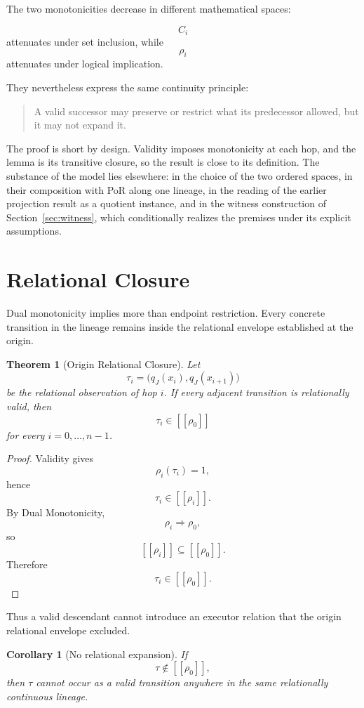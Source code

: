 \documentclass[10pt,twocolumn]{article}
\newcommand{\sem}[1]{\left[\!\left[#1\right]\!\right]}
\newtheorem{theorem}{Theorem}
\newtheorem{corollary}{Corollary}
\begin{document}
The two monotonicities decrease in different mathematical spaces:

\[
C_i
\]
attenuates under set inclusion, while
\[
\rho_i
\]
attenuates under logical implication.

They nevertheless express the same continuity principle:

\begin{quote}
A valid successor may preserve or restrict what its predecessor allowed, but it
may not expand it.
\end{quote}

The proof is short by design. Validity imposes monotonicity at each hop, and
the lemma is its transitive closure, so the result is close to its definition.
The substance of the model lies elsewhere: in the choice of the two ordered
spaces, in their composition with PoR along one lineage, in the reading of the
earlier projection result as a quotient instance, and in the witness
construction of Section~\ref{sec:witness}, which conditionally realizes the
premises under its explicit assumptions.

\section{Relational Closure}

Dual monotonicity implies more than endpoint restriction. Every concrete
transition in the lineage remains inside the relational envelope established at
the origin.

\begin{theorem}[Origin Relational Closure]
Let
\[
\tau_i=
\big(
q_J(x_i),
q_J(x_{i+1})
\big)
\]
be the relational observation of hop \(i\). If every adjacent transition is
relationally valid, then
\[
\tau_i\in\sem{\rho_0}
\]
for every \(i=0,\ldots,n-1\).
\end{theorem}

\begin{proof}
Validity gives
\[
\rho_i(\tau_i)=1,
\]
hence
\[
\tau_i\in\sem{\rho_i}.
\]
By Dual Monotonicity,
\[
\rho_i\Rightarrow\rho_0,
\]
so
\[
\sem{\rho_i}\subseteq\sem{\rho_0}.
\]
Therefore
\[
\tau_i\in\sem{\rho_0}.
\]
\end{proof}

Thus a valid descendant cannot introduce an executor relation that the origin
relational envelope excluded.

\begin{corollary}[No relational expansion]
If
\[
\tau\notin\sem{\rho_0},
\]
then \(\tau\) cannot occur as a valid transition anywhere in the same
relationally continuous lineage.
\end{corollary}
\end{document}
